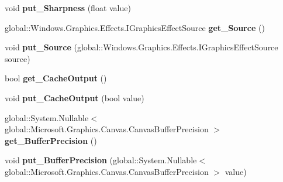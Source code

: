 \begin{DoxyCompactItemize}
void {\bfseries put\+\_\+\+Sharpness} (float value)
\item 
\mbox{\label{class_microsoft_1_1_graphics_1_1_canvas_1_1_effects_1_1_transform2_d_effect_af35c6e93668e25c4c57cbcbce7286516}} 
global\+::\+Windows.\+Graphics.\+Effects.\+I\+Graphics\+Effect\+Source {\bfseries get\+\_\+\+Source} ()
\item 
\mbox{\label{class_microsoft_1_1_graphics_1_1_canvas_1_1_effects_1_1_transform2_d_effect_a89344f36eb3d3c2b19dbe91b8d618d90}} 
void {\bfseries put\+\_\+\+Source} (global\+::\+Windows.\+Graphics.\+Effects.\+I\+Graphics\+Effect\+Source source)
\item 
\mbox{\label{class_microsoft_1_1_graphics_1_1_canvas_1_1_effects_1_1_transform2_d_effect_a0fa10cae13f8320eff8aec6d07d06087}} 
bool {\bfseries get\+\_\+\+Cache\+Output} ()
\item 
\mbox{\label{class_microsoft_1_1_graphics_1_1_canvas_1_1_effects_1_1_transform2_d_effect_a83fe51eac7119fbca7ce7c753822cb8f}} 
void {\bfseries put\+\_\+\+Cache\+Output} (bool value)
\item 
\mbox{\label{class_microsoft_1_1_graphics_1_1_canvas_1_1_effects_1_1_transform2_d_effect_a880fa5f2233568b3627f428cc5de4d8f}} 
global\+::\+System.\+Nullable$<$ global\+::\+Microsoft.\+Graphics.\+Canvas.\+Canvas\+Buffer\+Precision $>$ {\bfseries get\+\_\+\+Buffer\+Precision} ()
\item 
\mbox{\label{class_microsoft_1_1_graphics_1_1_canvas_1_1_effects_1_1_transform2_d_effect_a1399a9ece4dee31c180cb3fce03ec9fb}} 
void {\bfseries put\+\_\+\+Buffer\+Precision} (global\+::\+System.\+Nullable$<$ global\+::\+Microsoft.\+Graphics.\+Canvas.\+Canvas\+Buffer\+Precision $>$ value)
\item 
\mbox{\label{class_microsoft_1_1_graphics_1_1_canvas_1_1_effects_1_1_transform2_d_effect_a5385c5a89be0cd8d31e92ae8b1991cc0}} 

\end{DoxyCompactItemize}
